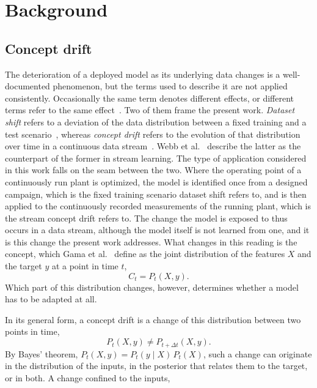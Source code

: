 %
%
\section{Background} \label{sec:background}
%
\subsection{Concept drift} \label{subsec:concept_drift}
%
The deterioration of a deployed model as its underlying data changes is a well-documented phenomenon, but the terms used to describe it are not applied consistently. Occasionally the same term denotes different effects, or different terms refer to the same effect~\cite{bayram.2022a}. Two of them frame the present work. \emph{Dataset shift} refers to a deviation of the data distribution between a fixed training and a test scenario~\cite{quinonero.2008}, whereas \emph{concept drift} refers to the evolution of that distribution over time in a continuous data stream~\cite{gama.2014}. Webb et al.~\cite{webb.2016} describe the latter as the counterpart of the former in stream learning. The type of application considered in this work falls on the seam between the two. Where the operating point of a continuously run plant is optimized, the model is identified once from a designed campaign, which is the fixed training scenario dataset shift refers to, and is then applied to the continuously recorded measurements of the running plant, which is the stream concept drift refers to. The change the model is exposed to thus occurs in a data stream, although the model itself is not learned from one, and it is this change the present work addresses. What changes in this reading is the concept, which Gama et al.~\cite{gama.2014} define as the joint distribution of the features $X$ and the target $y$ at a point in time $t$,
%
\begin{equation} \label{eq:concept}
    C_t = P_t(X, y).
\end{equation}
%
Which part of this distribution changes, however, determines whether a model has to be adapted at all. \par
%
In its general form, a concept drift is a change of this distribution between two points in time,
%
\begin{equation} \label{eq:concept_drift}
    P_t(X, y) \neq P_{t+\Delta t}(X, y).
\end{equation}
%
By Bayes' theorem, $P_t(X, y) = P_t(y \mid X)\,P_t(X)$, such a change can originate in the distribution of the inputs, in the posterior that relates them to the target, or in both. A change confined to the inputs,
